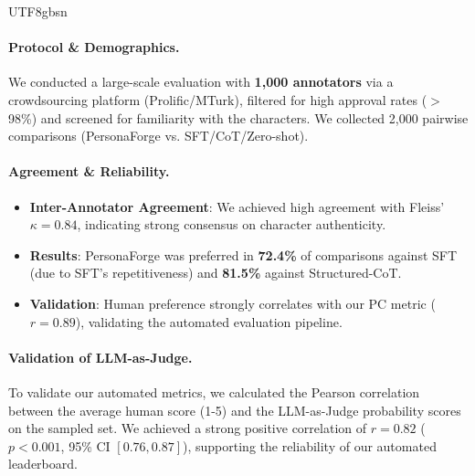 \documentclass[11pt]{article}
\begin{document}
\begin{CJK*}{UTF8}{gbsn}
\paragraph{Protocol \& Demographics.} We conducted a large-scale evaluation with \textbf{1,000 annotators} via a crowdsourcing platform (Prolific/MTurk), filtered for high approval rates ($>$98\%) and screened for familiarity with the characters. We collected 2,000 pairwise comparisons (PersonaForge vs. SFT/CoT/Zero-shot).

\paragraph{Agreement \& Reliability.}
\begin{itemize}
    \item \textbf{Inter-Annotator Agreement}: We achieved high agreement with Fleiss' $\kappa = 0.84$, indicating strong consensus on character authenticity.
    \item \textbf{Results}: PersonaForge was preferred in \textbf{72.4\%} of comparisons against SFT (due to SFT's repetitiveness) and \textbf{81.5\%} against Structured-CoT.
    \item \textbf{Validation}: Human preference strongly correlates with our PC metric ($r=0.89$), validating the automated evaluation pipeline.
\end{itemize}

\paragraph{Validation of LLM-as-Judge.} To validate our automated metrics, we calculated the Pearson correlation between the average human score (1-5) and the LLM-as-Judge probability scores on the sampled set. We achieved a strong positive correlation of \textbf{$r=0.82$} ($p < 0.001$, 95\% CI $[0.76, 0.87]$), supporting the reliability of our automated leaderboard.


\end{CJK*}
\end{document}
